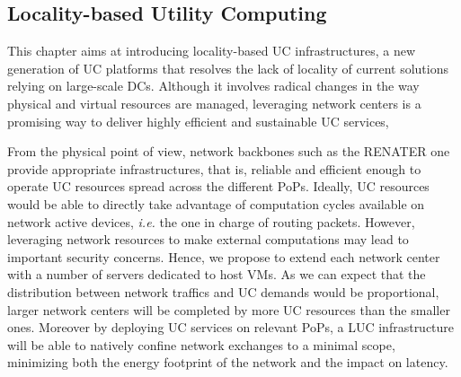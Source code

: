 \subsection{Locality-based Utility Computing}



This chapter aims at introducing locality-based UC infrastructures, a new
generation of UC platforms that resolves the lack of locality of current
solutions relying on large-scale DCs. Although it involves radical changes in
the way physical and virtual resources are managed,  leveraging network centers
is a promising way to deliver highly efficient and sustainable UC services, 

From the physical point of view, network backbones such as the RENATER one provide
appropriate infrastructures, that is, reliable and efficient enough to operate UC
resources spread across the different PoPs. Ideally, UC resources would be able to
directly
take advantage of computation cycles available on network active devices, \textit{i.e.} the one
in charge of routing packets. However, leveraging network resources to make external
computations may lead to important security concerns. Hence, we propose to extend each
network center with a number of servers dedicated to host VMs. As we can expect that the
distribution between network traffics and UC demands would be proportional, larger network
centers will be completed by more UC resources than the smaller ones. Moreover by deploying
UC services on relevant PoPs, a LUC infrastructure will be able to natively confine
network exchanges to a minimal scope, minimizing both the energy footprint of the network
and the impact on latency.

